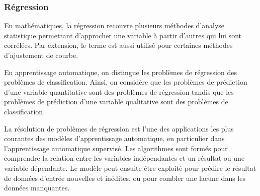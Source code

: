\documentclass[a4paper,12pt]{report}
\begin{document}
\subsubsection{Régression} 
 En mathématiques, la régression recouvre plusieurs méthodes d’analyse statistique permettant d’approcher une variable à partir d’autres qui lui sont corrélées. Par extension, le terme est aussi utilisé pour certaines méthodes d’ajustement de courbe.
 
 En apprentissage automatique, on distingue les problèmes de régression des problèmes de classification. Ainsi, on considère que les problèmes de prédiction d'une variable quantitative sont des problèmes de régression tandis que les problèmes de prédiction d'une variable qualitative sont des problèmes de classification.
 
 La résolution de problèmes de régression est l'une des applications les plus courantes des modèles d'apprentissage automatique, en particulier dans l'apprentissage automatique supervisé. Les algorithmes sont formés pour comprendre la relation entre les variables indépendantes et un résultat ou une variable dépendante. Le modèle peut ensuite être exploité pour prédire le résultat de données d'entrée nouvelles et inédites, ou pour combler une lacune dans les données manquantes.
 
\end{document}
